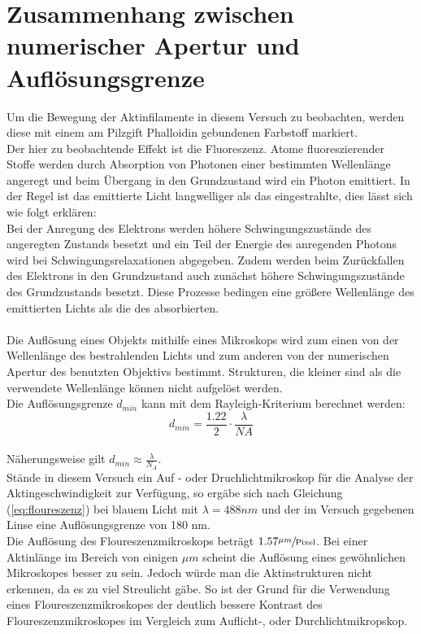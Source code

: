 \section{Zusammenhang zwischen numerischer Apertur und Auflösungsgrenze}
Um die Bewegung der Aktinfilamente in diesem Versuch zu beobachten, werden diese mit einem am Pilzgift Phalloidin gebundenen Farbstoff markiert.\\
Der hier zu beobachtende Effekt ist die Fluoreszenz. Atome fluoreszierender Stoffe werden durch Absorption von Photonen einer bestimmten Wellenlänge angeregt und beim Übergang in den Grundzustand wird ein Photon emittiert. In der Regel ist das emittierte Licht langwelliger als das eingestrahlte, dies lässt sich wie folgt erklären:\\
Bei der Anregung des Elektrons werden höhere Schwingungszustände des angeregten Zustands besetzt und ein Teil der Energie des anregenden Photons wird bei Schwingungsrelaxationen abgegeben. Zudem werden beim Zurückfallen des Elektrons in den Grundzustand auch zunächst höhere Schwingungszustände des Grundzustands besetzt. Diese Prozesse bedingen eine größere Wellenlänge des emittierten Lichts als die des absorbierten.\\
\\
Die Auflösung eines Objekts mithilfe eines Mikroskops wird zum einen von der Wellenlänge des bestrahlenden Lichts und zum anderen von der numerischen Apertur des benutzten Objektivs bestimmt. Strukturen, die kleiner sind als die verwendete Wellenlänge können nicht aufgelöst werden.\\
Die Auflösungsgrenze $d_{min}$ kann mit dem Rayleigh-Kriterium berechnet werden:
\begin{equation*}
d_{min}=\frac{1.22}{2}\cdot \frac{\lambda}{NA}
\label{eq:floureszenz}
\end{equation*}
\\
Näherungsweise gilt $d_{min} \approx \frac{ \lambda}{N_{A}}$.\\
Stände in diesem Versuch ein Auf - oder Druchlichtmikroskop
für die Analyse der Aktingeschwindigkeit zur Verfügung, so ergäbe sich nach Gleichung (\ref{eq:floureszenz}) bei blauem
Licht mit $ \lambda = 488nm$ und der im Versuch gegebenen Linse eine
Auflösungsgrenze von 180 nm. \\
Die Auflösung des Floureszenzmikroskops beträgt $1.57 \sfrac{\mu m}{\text{Pixel}}$.
Bei einer Aktinlänge im Bereich von einigen $\mu m$ \cite{FOPRA_molecular_motors}
scheint die Auflösung eines gewöhnlichen Mikroskopes besser zu sein.
Jedoch würde man die Aktinstrukturen nicht erkennen, da es zu viel Streulicht gäbe.
So ist der Grund für die Verwendung eines Floureszenzmikroskopes der
deutlich bessere Kontrast des Floureszenzmikroskopes im Vergleich zum Auflicht-,
oder Durchlichtmikropskop.

